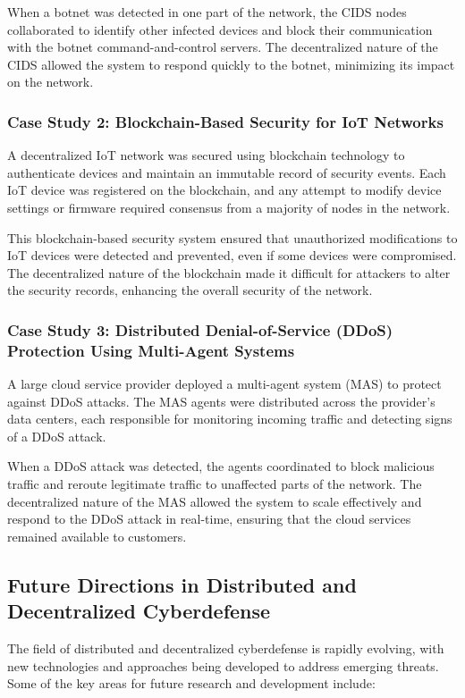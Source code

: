 When a botnet was detected in one part of the network, the CIDS nodes collaborated to identify other infected devices and block their communication with the botnet command-and-control servers. The decentralized nature of the CIDS allowed the system to respond quickly to the botnet, minimizing its impact on the network.

\subsubsection{Case Study 2: Blockchain-Based Security for IoT Networks}

A decentralized IoT network was secured using blockchain technology to authenticate devices and maintain an immutable record of security events. Each IoT device was registered on the blockchain, and any attempt to modify device settings or firmware required consensus from a majority of nodes in the network.

This blockchain-based security system ensured that unauthorized modifications to IoT devices were detected and prevented, even if some devices were compromised. The decentralized nature of the blockchain made it difficult for attackers to alter the security records, enhancing the overall security of the network.

\subsubsection{Case Study 3: Distributed Denial-of-Service (DDoS) Protection Using Multi-Agent Systems}

A large cloud service provider deployed a multi-agent system (MAS) to protect against DDoS attacks. The MAS agents were distributed across the provider's data centers, each responsible for monitoring incoming traffic and detecting signs of a DDoS attack.

When a DDoS attack was detected, the agents coordinated to block malicious traffic and reroute legitimate traffic to unaffected parts of the network. The decentralized nature of the MAS allowed the system to scale effectively and respond to the DDoS attack in real-time, ensuring that the cloud services remained available to customers.

\subsection{Future Directions in Distributed and Decentralized Cyberdefense}

The field of distributed and decentralized cyberdefense is rapidly evolving, with new technologies and approaches being developed to address emerging threats. Some of the key areas for future research and development include:

